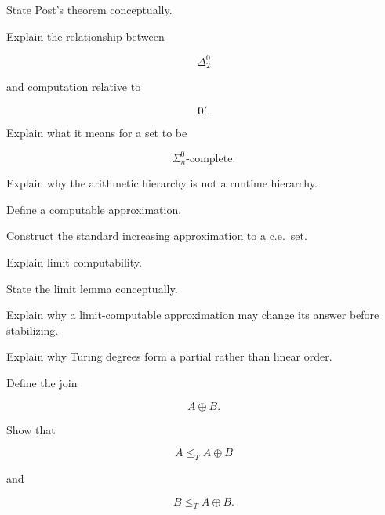 \begin{exercise}[3]
State Post's theorem conceptually.
\end{exercise}

\begin{exercise}[3]
Explain the relationship between

\[
\Delta^0_2
\]

and computation relative to

\[
\mathbf{0}'.
\]
\end{exercise}

\begin{exercise}[3]
Explain what it means for a set to be

\[
\Sigma^0_n\text{-complete}.
\]
\end{exercise}

\begin{exercise}[3]
Explain why the arithmetic hierarchy is not a runtime hierarchy.
\end{exercise}

\begin{exercise}[2]
Define a computable approximation.
\end{exercise}

\begin{exercise}[3]
Construct the standard increasing approximation to a c.e.\ set.
\end{exercise}

\begin{exercise}[3]
Explain limit computability.
\end{exercise}

\begin{exercise}[3]
State the limit lemma conceptually.
\end{exercise}

\begin{exercise}[3]
Explain why a limit-computable approximation may change its answer before
stabilizing.
\end{exercise}

\begin{exercise}[3]
Explain why Turing degrees form a partial rather than linear order.
\end{exercise}

\begin{exercise}[3]
Define the join

\[
A\oplus B.
\]
\end{exercise}

\begin{exercise}[3]
Show that

\[
A\leq_TA\oplus B
\]

and

\[
B\leq_TA\oplus B.
\]
\end{exercise}

